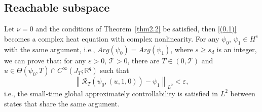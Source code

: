 \documentclass[review]{elsarticle}
\theoremstyle{dotless}
\def \geq{\geqslant}
\numberwithin{equation}{section}
\begin{document}
\subsection{Reachable subspace}\label{sec:reachable}
Let $ \nu=0$ and the conditions of Theorem~\ref{thm2.2} be satisfied, then \eqref{(0.1)} becomes a complex heat equation with complex nonlinearity. For any $\psi_0,\,\psi_1\in H^s$ with the same argument, i.e., $ Arg(\psi_0)=Arg(\psi_1)$, where $s \geq s_d$ is an integer, we can prove that: for any $\varepsilon>0,\, \mathcal{T}>0$, there are $T \in(0, \mathcal{T})$ and $u \in \Theta\left(\psi_0, T\right) \cap C^{\infty}\left(J_T ; \mathbb{R}^q\right)$ such that
\begin{equation}\label{eq:globalArg}
	\left\|\mathcal{R}_T\left(\psi_0, (u,1,0)\right)-  \psi_1\right\|_{L^2}<\varepsilon,
\end{equation}i.e., the small-time global approximately controllability is satisfied in $L^2$ between states that share the same argument.
\end{document}
